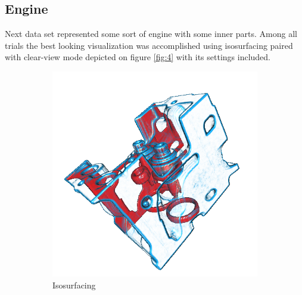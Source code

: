 \documentclass{article}
\begin{document}
\subsection{Engine}
Next data set represented some sort of engine with some inner parts. Among all trials the best looking visualization was accomplished using isosurfacing paired with clear-view mode depicted on figure \ref{fig:4} with its settings included.
\begin{figure}
	\centering
	\begin{subfigure}[h]{0.5\textwidth}
		\includegraphics[width=\textwidth]{engine-iso-view.png}
		\caption{Isosurfacing}
		\label{fig:picture}
	\end{subfigure}
	\begin{subfigure}[h]{0.3\textwidth}

\end{subfigure}
\end{figure}
\end{document}
